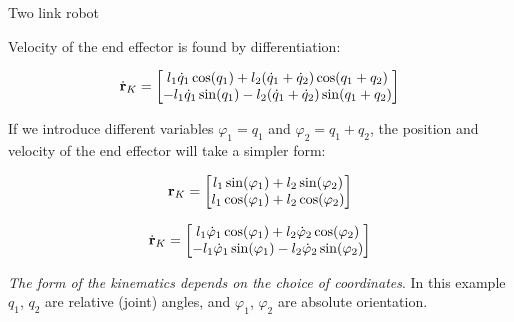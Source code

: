 \documentclass{beamer}
\begin{document}
\begin{frame}{Two link robot}
	\begin{flushleft}
		
		Velocity of the end effector is found by differentiation:
		
				\begin{equation}
					\dot{\mathbf{r}}_K = 
					\begin{bmatrix}
						l_1 \dot q_1\cos (q_1) + l_2 (\dot q_1+\dot q_2) \cos (q_1+q_2) \\ 
					  - l_1 \dot q_1\sin (q_1)  - l_2 (\dot q_1+\dot q_2) \sin (q_1+q_2) 
					\end{bmatrix}
				\end{equation}
		
		If we introduce different variables $\varphi_1 = q_1$ and $\varphi_2 = q_1 + q_2$, the position and velocity of the end effector will take a simpler form:
		
		\begin{equation}
			\mathbf{r}_K = \begin{bmatrix}
				l_1 \sin (\varphi_1) + l_2 \sin (\varphi_2) \\ 
				l_1 \cos (\varphi_1) + l_2 \cos (\varphi_2) 
			\end{bmatrix}
		\end{equation}
		
		\begin{equation}
			\dot{\mathbf{r}}_K = 
			\begin{bmatrix}
				l_1 \dot \varphi_1\cos (\varphi_1) + l_2 \dot \varphi_2 \cos (\varphi_2) \\ 
			  - l_1 \dot \varphi_1\sin (\varphi_1)  - l_2 \dot \varphi_2 \sin (\varphi_2) 
			\end{bmatrix}
		\end{equation}
		
		\emph{The form of the kinematics depends on the choice of coordinates}. In this example $q_1$, $q_2$ are relative (joint) angles, and $\varphi_1$, $\varphi_2$ are absolute orientation.
		
	\end{flushleft}
\end{frame}
\end{document}
